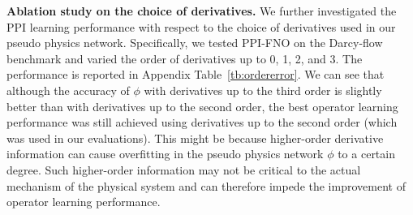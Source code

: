 \noindent\textbf{Ablation study on the choice of derivatives.}
We further investigated the PPI learning performance with respect to the choice of derivatives used in our pseudo physics network. Specifically, we tested PPI-FNO on the Darcy-flow benchmark and varied the order of derivatives up to 0, 1, 2, and 3. The performance is reported in Appendix Table~\ref{tb:ordererror}. We can see that although the accuracy of $\phi$ with derivatives up to the third order is slightly better than with derivatives up to the second order, the best operator learning performance was still achieved using derivatives up to the second order (which was used in our evaluations). This might be because higher-order derivative information can cause overfitting in the pseudo physics network $\phi$ to a certain degree. Such higher-order information may not be critical to the actual mechanism of the physical system and can therefore impede the improvement of operator learning performance.

